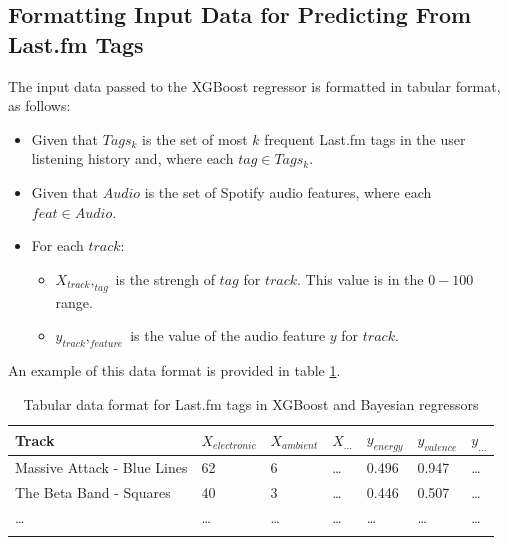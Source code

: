 \documentclass[sn-mathphys]{sn-jnl}%
\theoremstyle{thmstyleone}%
\theoremstyle{thmstyletwo}%
\theoremstyle{thmstylethree}%
\begin{document}
\subsection{Formatting Input Data for Predicting From Last.fm Tags}

The input data passed to the XGBoost regressor is formatted in tabular format, as follows:

\begin{itemize}
      \item Given that $Tags_{k}$ is the set of most $k$ frequent Last.fm tags in the user listening history
            and, where each $tag \in Tags_{k}$.
      \item Given that $Audio$ is the set of Spotify audio features, where each $feat \in Audio$.
      \item For each $track$:
      \begin{itemize}
            \item $X_{track},_{tag}$ is the strengh of $tag$ for $track$. This value is in the $0-100$ range.
            \item $y_{track},_{feature}$ is the value of the audio feature $y$ for $track$.
      \end{itemize}
\end{itemize}

An example of this data format is provided in table \ref{tabular_tags_format}.

\begin{table}[h]
      \begin{center}
      \begin{minipage}{\textwidth}
      \caption{Tabular data format for Last.fm tags in XGBoost and Bayesian regressors}\label{tabular_tags_format}%
      \begin{tabular}{@{}lllllll@{}}
      \toprule
      Track                         & $X_{electronic}$ & $X_{ambient}$ & $X_{\dots}$ & $y_{energy}$ & $y_{valence}$ & $y_{\dots}$ \\
      \midrule
      Massive Attack - Blue Lines   & 62               & 6             &  \dots      & 0.496        & 0.947         & \dots  \\
      The Beta Band - Squares       & 40               & 3             &  \dots      & 0.446        & 0.507         & \dots  \\
      \dots                         & \dots            & \dots         &  \dots      & \dots        & \dots         & \dots  \\
      \botrule
      \end{tabular}
      \end{minipage}
      \end{center}
\end{table}
\end{document}
